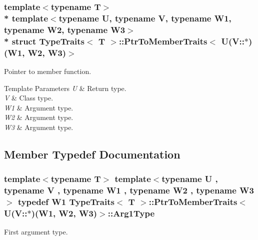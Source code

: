 \subsubsection*{template$<$typename T$>$\\*
template$<$typename U, typename V, typename W1, typename W2, typename W3$>$\\*
struct Type\+Traits$<$ T $>$\+::\+Ptr\+To\+Member\+Traits$<$ U(\+V\+::$\ast$)(\+W1, W2, W3)$>$}

Pointer to member function. 
\begin{DoxyTemplParams}{Template Parameters}
{\em U} & Return type. \\
\hline
{\em V} & Class type. \\
\hline
{\em W1} & Argument type. \\
\hline
{\em W2} & Argument type. \\
\hline
{\em W3} & Argument type. \\
\hline
\end{DoxyTemplParams}


\subsection{Member Typedef Documentation}
\subsubsection[{\texorpdfstring{Arg1\+Type}{Arg1Type}}]{\setlength{\rightskip}{0pt plus 5cm}template$<$typename T$>$ template$<$typename U , typename V , typename W1 , typename W2 , typename W3 $>$ typedef W1 {\bf Type\+Traits}$<$ T $>$\+::{\bf Ptr\+To\+Member\+Traits}$<$ U(V\+::$\ast$)(W1, W2, W3)$>$\+::{\bf Arg1\+Type}}\hypertarget{structTypeTraits_1_1PtrToMemberTraits_3_01U_07V_1_1_5_08_07W1_00_01W2_00_01W3_08_4_af59af076ef690d78f4668b97b899f142}{}\label{structTypeTraits_1_1PtrToMemberTraits_3_01U_07V_1_1_5_08_07W1_00_01W2_00_01W3_08_4_af59af076ef690d78f4668b97b899f142}
First argument type. 
